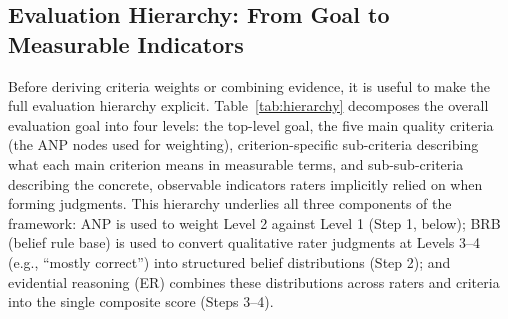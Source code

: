 \documentclass[conference]{IEEEtran}
\begin{document}
\subsection{Evaluation Hierarchy: From Goal to Measurable Indicators}
Before deriving criteria weights or combining evidence, it is useful to make the full evaluation hierarchy explicit. Table~\ref{tab:hierarchy} decomposes the overall evaluation goal into four levels: the top-level goal, the five main quality criteria (the ANP nodes used for weighting), criterion-specific sub-criteria describing what each main criterion means in measurable terms, and sub-sub-criteria describing the concrete, observable indicators raters implicitly relied on when forming judgments. This hierarchy underlies all three components of the framework: ANP is used to weight Level 2 against Level 1 (Step 1, below); BRB (belief rule base) is used to convert qualitative rater judgments at Levels 3--4 (e.g., ``mostly correct'') into structured belief distributions (Step 2); and evidential reasoning (ER) combines these distributions across raters and criteria into the single composite score (Steps 3--4).
\end{document}
